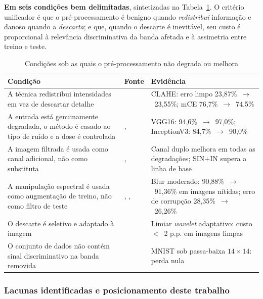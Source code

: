 \documentclass[conference]{IEEEtran}
\begin{document}
\textbf{Em seis condições bem delimitadas}, sintetizadas na
Tabela~\ref{tab:condicoes}. O critério unificador é que o pré-processamento é benigno quando \emph{redistribui} informação e danoso quando a \emph{descarta}; e que, quando
o descarte é inevitável, seu custo é proporcional à relevância discriminativa
da banda afetada e à assimetria entre treino e teste.

\begin{table}[htbp]
\caption{Condições sob as quais o pré-processamento não degrada ou melhora}
\begin{center}
\footnotesize
\begin{tabular}{|p{3.0cm}|p{1.1cm}|p{2.5cm}|}
\hline
\textbf{Condição} & \textbf{Fonte} & \textbf{Evidência} \\
\hline
A técnica redistribui intensidades em vez de descartar detalhe & \cite{b6} &
CLAHE: erro limpo 23,87\%~$\rightarrow$~23,55\%; mCE
76,7\%~$\rightarrow$~74,5\% \\
\hline
A entrada está genuinamente degradada, o método é casado ao tipo de ruído e a
dose é controlada & \cite{b26}, \cite{b8} & VGG16:
94,6\%~$\rightarrow$~97,0\%; InceptionV3: 84,7\%~$\rightarrow$~90,0\% \\
\hline
A imagem filtrada é usada como canal adicional, não como substituta &
\cite{b9}, \cite{b16} & Canal duplo melhora em todas as degradações;
SIN$+$IN supera a linha de base \\
\hline
A manipulação espectral é usada como augmentação de treino, não como filtro de
teste & \cite{b4}, \cite{b28}, \cite{b29} & Blur moderado:
90,88\%~$\rightarrow$~91,36\% em imagens nítidas; erro de corrupção
28,35\%~$\rightarrow$~26,26\% \\
\hline
O descarte é seletivo e adaptado à imagem & \cite{b11} & Limiar
\textit{wavelet} adaptativo: custo $<$~2 p.p. em imagens limpas \\
\hline
O conjunto de dados não contém sinal discriminativo na banda removida &
\cite{b23} & MNIST sob passa-baixa $14\times14$: perda nula \\
\hline
\end{tabular}
\label{tab:condicoes}
\end{center}
\end{table}

\subsubsection{Lacunas identificadas e posicionamento deste trabalho}
\end{document}
